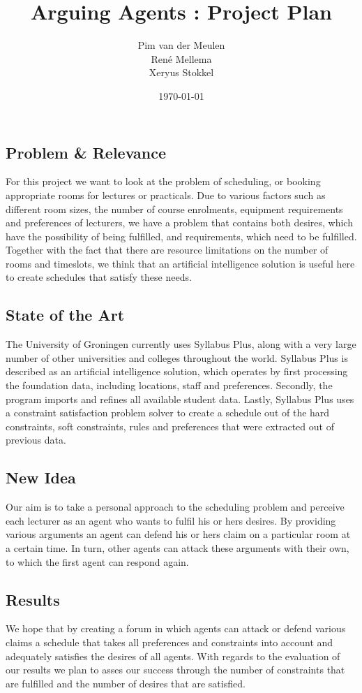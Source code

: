 \documentclass[a4paper]{article}
\title{\textsf{Arguing Agents :} Project Plan}
\author{Pim van der Meulen \\Ren\'e Mellema \\Xeryus Stokkel}
\date{\today}
\begin{document}
\maketitle

\subsection*{Problem \& Relevance}
For this project we want to look at the problem of scheduling, or booking appropriate rooms for lectures or practicals. Due to various factors such as different room sizes, the number of course enrolments, equipment requirements and preferences of lecturers, we have a problem that contains both desires, which have the possibility of being fulfilled, and requirements, which need to be fulfilled. Together with the fact that there are resource limitations on the number of rooms and timeslots, we think that an artificial intelligence solution is useful here to create schedules that satisfy these needs.      
 
\subsection*{State of the Art}
The University of Groningen currently uses Syllabus Plus, along with a very large number of other universities and colleges throughout the world. Syllabus Plus is described as an artificial intelligence solution, which operates by first processing the foundation data, including locations, staff and preferences. Secondly, the program imports and refines all available student data. Lastly, Syllabus Plus uses a constraint satisfaction problem solver to create a schedule out of the hard constraints, soft constraints, rules and preferences that were extracted out of previous data.  

\subsection*{New Idea}
Our aim is to take a personal approach to the scheduling problem and perceive each lecturer as an agent who wants to fulfil his or hers desires. By providing various arguments an agent can defend his or hers claim on a particular room at a certain time. In turn, other agents can attack these arguments with their own, to which the first agent can respond again. 

\subsection*{Results}
We hope that by creating a forum in which agents can attack or defend various claims a schedule that takes all preferences and constraints into account and adequately satisfies the desires of all agents. With regards to the evaluation of our results we plan to asses our success through the number of constraints that are fulfilled and the number of desires that are satisfied.
\end{document}
